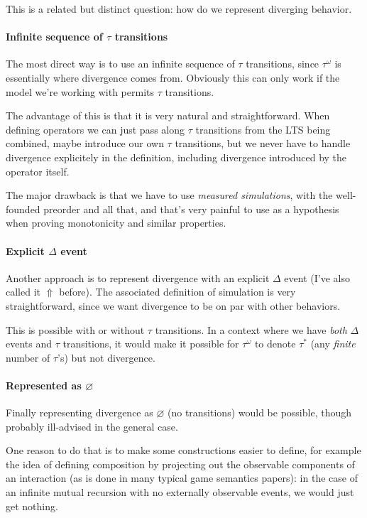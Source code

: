 \documentclass[11pt]{article}
\begin{document}
This is a related but distinct question:
how do we represent diverging behavior.

\paragraph{Infinite sequence of $\tau$ transitions}

The most direct way is to use an infinite sequence of $\tau$ transitions,
since $\tau^\omega$ is essentially where divergence comes from.
Obviously this can only work if the model we're working with
permits $\tau$ transitions.

The advantage of this is that it is very natural and straightforward.
When defining operators we can just pass along $\tau$ transitions from
the LTS being combined,
maybe introduce our own $\tau$ transitions,
but we never have to handle divergence explicitely
in the definition,
including divergence introduced by the operator itself.

The major drawback is that we have to use \emph{measured simulations},
with the well-founded preorder and all that,
and that's very painful to use as a hypothesis
when proving monotonicity and similar properties.

\paragraph{Explicit $\Delta$ event}

Another approach is to represent divergence
with an explicit $\Delta$ event (I've also called it $\Uparrow$ before).
The associated definition of simulation is very straightforward,
since we want divergence to be on par with other behaviors.

This is possible with or without $\tau$ transitions.
In a context where we have \emph{both} $\Delta$ events and $\tau$ transitions,
it would make it possible for $\tau^\omega$ to denote $\tau^*$
(any \emph{finite} number of $\tau$'s)
but not divergence.

\paragraph{Represented as $\varnothing$}

Finally representing divergence as $\varnothing$ (no transitions)
would be possible, though probably ill-advised in the general case.

One reason to do that is
to make some constructions easier to define,
for example the idea of defining composition
by projecting out the observable components of an interaction
(as is done in many typical game semantics papers):
in the case of an infinite mutual recursion with no
externally observable events,
we would just get nothing.
\end{document}

